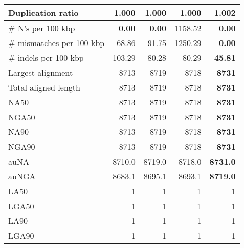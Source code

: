 \documentclass[12pt,a4paper]{article}
\begin{document}
\begin{table}[ht]
\begin{center}
\begin{tabular}{|l*{4}{|r}|}
Duplication ratio & {\bf 1.000} & {\bf 1.000} & {\bf 1.000} & 1.002 \\ \hline
\# N's per 100 kbp & {\bf 0.00} & {\bf 0.00} & 1158.52 & {\bf 0.00} \\ \hline
\# mismatches per 100 kbp & 68.86 & 91.75 & 1250.29 & {\bf 0.00} \\ \hline
\# indels per 100 kbp & 103.29 & 80.28 & 80.29 & {\bf 45.81} \\ \hline
Largest alignment & 8713 & 8719 & 8718 & {\bf 8731} \\ \hline
Total aligned length & 8713 & 8719 & 8718 & {\bf 8731} \\ \hline
NA50 & 8713 & 8719 & 8718 & {\bf 8731} \\ \hline
NGA50 & 8713 & 8719 & 8718 & {\bf 8731} \\ \hline
NA90 & 8713 & 8719 & 8718 & {\bf 8731} \\ \hline
NGA90 & 8713 & 8719 & 8718 & {\bf 8731} \\ \hline
auNA & 8710.0 & 8719.0 & 8718.0 & {\bf 8731.0} \\ \hline
auNGA & 8683.1 & 8695.1 & 8693.1 & {\bf 8719.0} \\ \hline
LA50 & 1 & 1 & 1 & 1 \\ \hline
LGA50 & 1 & 1 & 1 & 1 \\ \hline
LA90 & 1 & 1 & 1 & 1 \\ \hline
LGA90 & 1 & 1 & 1 & 1 \\ \hline
\end{tabular}
\end{center}
\end{table}
\end{document}
